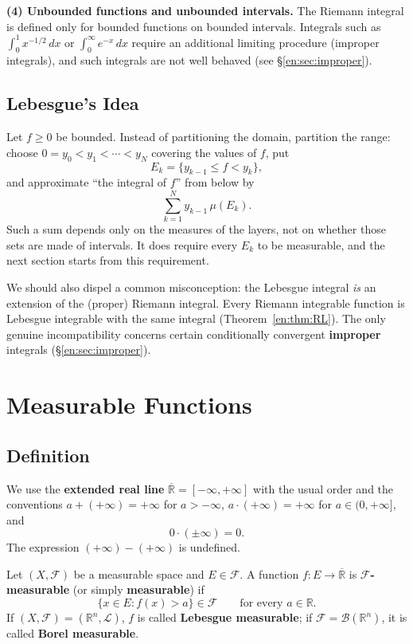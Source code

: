 \documentclass[11pt]{article}
\begin{document}
\textbf{(4) Unbounded functions and unbounded intervals.} The Riemann integral is defined only for bounded functions on bounded intervals. Integrals such as $\int_{0}^{1}x^{-1/2}\,dx$ or $\int_{0}^{\infty}e^{-x}\,dx$ require an additional limiting procedure (improper integrals), and such integrals are not well behaved (see \S\ref{en:sec:improper}).

\subsection{Lebesgue's Idea}

Let $f\geq0$ be bounded. Instead of partitioning the domain, partition the range: choose $0=y_{0}<y_{1}<\cdots<y_{N}$ covering the values of $f$, put
\[
E_{k}=\{y_{k-1}\leq f<y_{k}\},
\]
and approximate ``the integral of $f$'' from below by
\[
\sum_{k=1}^{N}y_{k-1}\,\mu(E_{k}).
\]
Such a sum depends only on the measures of the layers, not on whether those sets are made of intervals. It does require every $E_{k}$ to be measurable, and the next section starts from this requirement.

We should also dispel a common misconception: the Lebesgue integral \emph{is} an extension of the (proper) Riemann integral. Every Riemann integrable function is Lebesgue integrable with the same integral (Theorem~\ref{en:thm:RL}). The only genuine incompatibility concerns certain conditionally convergent \textbf{improper} integrals (\S\ref{en:sec:improper}).

\section{Measurable Functions}

\subsection{Definition}

We use the \textbf{extended real line} $\overline{\mathbb{R}}=[-\infty,+\infty]$ with the usual order and the conventions $a+(+\infty)=+\infty$ for $a>-\infty$, $a\cdot(+\infty)=+\infty$ for $a\in(0,+\infty]$, and
\[
0\cdot(\pm\infty)=0.
\]
The expression $(+\infty)-(+\infty)$ is undefined.

\begin{definition}
Let $(X,\mathcal{F})$ be a measurable space and $E\in\mathcal{F}$. A function $f:E\to\overline{\mathbb{R}}$ is \textbf{$\mathcal{F}$-measurable} (or simply \textbf{measurable}) if
\[
\{x\in E:f(x)>a\}\in\mathcal{F}\qquad\text{for every }a\in\mathbb{R}.
\]
If $(X,\mathcal{F})=(\mathbb{R}^{n},\mathcal{L})$, $f$ is called \textbf{Lebesgue measurable}; if $\mathcal{F}=\mathcal{B}(\mathbb{R}^{n})$, it is called \textbf{Borel measurable}.
\end{definition}
\end{document}
